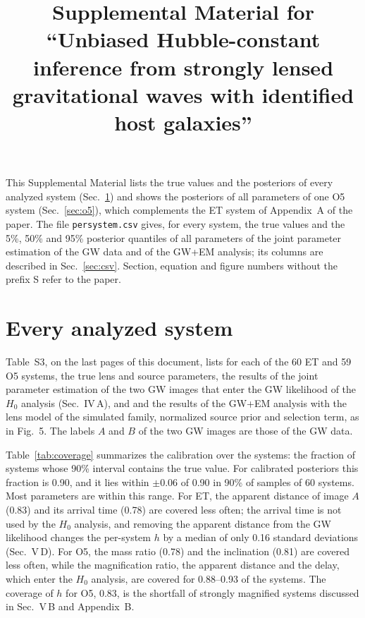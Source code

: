 \documentclass[aps,prd,onecolumn,nofootinbib,floatfix]{revtex4-2}
\begin{document}
\title{Supplemental Material for ``Unbiased Hubble-constant inference from strongly lensed gravitational waves with identified host galaxies''}
\maketitle

This Supplemental Material lists the true values and the posteriors of every analyzed system (Sec.~\ref{sec:all}) and shows the posteriors of all parameters of one O5 system (Sec.~\ref{sec:o5}), which complements the ET system of Appendix~A of the paper. The file \texttt{persystem.csv} gives, for every system, the true values and the 5\%, 50\% and 95\% posterior quantiles of all parameters of the joint parameter estimation of the GW data and of the GW+EM analysis; its columns are described in Sec.~\ref{sec:csv}. Section, equation and figure numbers without the prefix S refer to the paper.

\section{Every analyzed system}
\label{sec:all}
Table~S3, on the last pages of this document, lists for each of the 60 ET and 59 O5 systems, the true lens and source parameters, the results of the joint parameter estimation of the two GW images that enter the GW likelihood of the $H_0$ analysis (Sec.~IV\,A), and and the results of the GW+EM analysis with the lens model of the simulated family, normalized source prior and selection term, as in Fig.~5. The labels $A$ and $B$ of the two GW images are those of the GW data.

Table~\ref{tab:coverage} summarizes the calibration over the systems: the fraction of systems whose 90\% interval contains the true value. For calibrated posteriors this fraction is 0.90, and it lies within $\pm0.06$ of 0.90 in 90\% of samples of 60 systems. Most parameters are within this range. For ET, the apparent distance of image $A$ (0.83) and its arrival time (0.78) are covered less often; the arrival time is not used by the $H_0$ analysis, and removing the apparent distance from the GW likelihood changes the per-system $h$ by a median of only 0.16 standard deviations (Sec.~V\,D). For O5, the mass ratio (0.78) and the inclination (0.81) are covered less often, while the magnification ratio, the apparent distance and the delay, which enter the $H_0$ analysis, are covered for 0.88--0.93 of the systems. The coverage of $h$ for O5, 0.83, is the shortfall of strongly magnified systems discussed in Sec.~V\,B and Appendix~B.
\end{document}
